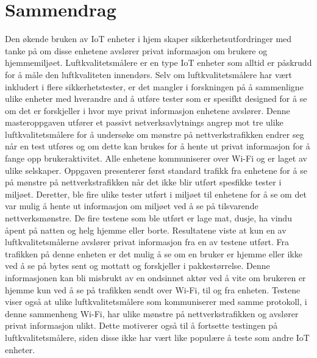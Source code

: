 \chapter*{Sammendrag}
Den økende bruken av IoT enheter i hjem skaper sikkerhetsutfordringer med tanke på om disse enhetene avslører privat informasjon om brukere og hjemmemiljøet. Luftkvalitetsmålere er en type IoT
enheter som alltid er påskrudd for å måle den luftkvaliteten innendørs. Selv om luftkvalitetsmålere har vært inkludert i flere sikkerhetstester, er det mangler i forskningen på å sammenligne ulike enheter med hverandre and å utføre tester som er spesifkt designed for å se om det er forskjeller i hvor mye privat informasjon enhetene avslører. Denne masteroppgaven utfører et passivt netverksavlytnings angrep mot tre ulike luftkvalitetsmålere for å undersøke om mønstre på nettverkstrafikken endrer seg når en test utføres og om dette kan brukes for å hente ut privat informasjon for å fange opp brukeraktivitet. Alle enhetene kommuniserer over Wi-Fi og er laget av ulike selskaper. Oppgaven presenterer først standard trafikk fra enhetene for å se på mønstre på nettverkstrafikken når det ikke blir utført spesfikke tester i miljøet. Deretter, ble fire ulike tester utført i miljøet til enhetene for å se om det var mulig å hente ut informasjon om miljøet ved å se på tilsvarende nettverksmønstre. De fire testene som ble utført er lage mat, dusje, ha vindu åpent på natten og helg hjemme eller borte. Resultatene viste at kun en av luftkvalitetsmålerne avslører privat informasjon fra en av testene utført. Fra trafikken på denne enheten er det mulig å se om en bruker er hjemme eller ikke ved å se på bytes sent og mottatt og forskjeller i pakkestørrelse. Denne informasjonen kan bli misbrukt av en ondsinnet aktør ved å vite om brukeren er hjemme kun ved å se på trafikken sendt over Wi-Fi, til og fra enheten. Testene viser også at ulike luftkvalitetsmålere som kommuniserer med samme protokoll, i denne sammenheng Wi-Fi, har ulike mønstre på nettverkstrafikken og avslører privat informasjon ulikt. Dette motiverer også til å fortsette testingen på luftkvalitetsmålere, siden disse ikke har vært like populære å teste som andre IoT enheter. 